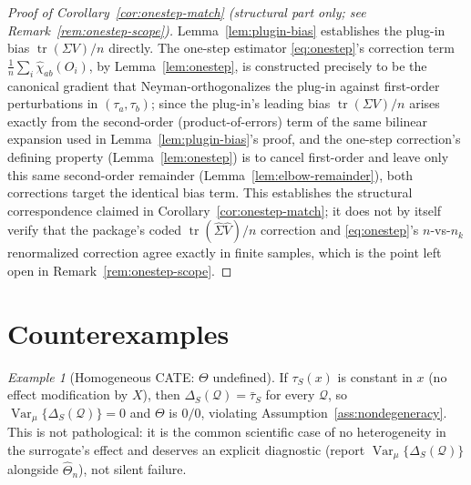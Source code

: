\documentclass[11pt]{article}
\theoremstyle{plain}
\theoremstyle{definition}
\theoremstyle{remark}
\newtheorem{example}[theorem]{Example}
\newcommand{\Q}{\mathcal{Q}}
\DeclareMathOperator{\Var}{Var}
\DeclareMathOperator{\tr}{tr}
\begin{document}
\begin{proof}[Proof of Corollary~\ref{cor:onestep-match} (structural part only; see Remark~\ref{rem:onestep-scope})]
Lemma~\ref{lem:plugin-bias} establishes the plug-in bias $\tr(\Sigma V)/n$ directly.
The one-step estimator \eqref{eq:onestep}'s correction term
$\frac1n\sum_i\hat\chi_{ab}(O_i)$, by Lemma~\ref{lem:onestep}, is constructed
precisely to be the canonical gradient that Neyman-orthogonalizes the plug-in against
first-order perturbations in $(\tau_a,\tau_b)$; since the plug-in's leading bias
$\tr(\Sigma V)/n$ arises exactly from the second-order (product-of-errors) term of the
same bilinear expansion used in Lemma~\ref{lem:plugin-bias}'s proof, and the one-step
correction's defining property (Lemma~\ref{lem:onestep}) is to cancel first-order and
leave only this same second-order remainder (Lemma~\ref{lem:elbow-remainder}), both
corrections target the identical bias term. This establishes the structural
correspondence claimed in Corollary~\ref{cor:onestep-match}; it does not by itself
verify that the package's coded $\tr(\hat\Sigma\hat V)/n$ correction and
\eqref{eq:onestep}'s $n$-vs-$n_k$ renormalized correction agree exactly in finite
samples, which is the point left open in Remark~\ref{rem:onestep-scope}.
\end{proof}

\section{Counterexamples}\label{app:counterex}

\begin{example}[Homogeneous CATE: $\Theta$ undefined]\label{ex:homogeneous}
If $\tau_S(x)$ is constant in $x$ (no effect modification by $X$), then
$\Delta_S(\Q)=\bar\tau_S$ for every $\Q$, so $\Var_\mu\{\Delta_S(\Q)\}=0$ and $\Theta$
is $0/0$, violating Assumption~\ref{ass:nondegeneracy}. This is not pathological: it
is the common scientific case of no heterogeneity in the surrogate's effect and
deserves an explicit diagnostic (report $\Var_\mu\{\Delta_S(\Q)\}$ alongside
$\hat\Theta_n$), not silent failure.
\end{example}
\end{document}
